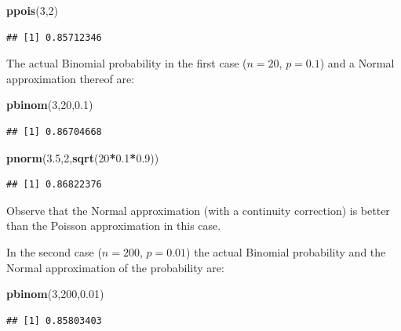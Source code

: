 \documentclass[]{krantz}
\makeatletter
\newenvironment{Shaded}{\begin{snugshade}}{\end{snugshade}}
\newcommand{\KeywordTok}[1]{\textcolor[rgb]{0.13,0.29,0.53}{\textbf{#1}}}
\newcommand{\DecValTok}[1]{\textcolor[rgb]{0.00,0.00,0.81}{#1}}
\newcommand{\FloatTok}[1]{\textcolor[rgb]{0.00,0.00,0.81}{#1}}
\newcommand{\OperatorTok}[1]{\textcolor[rgb]{0.81,0.36,0.00}{\textbf{#1}}}
\newcommand{\NormalTok}[1]{#1}
\newenvironment{kframe}{%
\medskip{}
\setlength{\fboxsep}{.8em}
 \def\at@end@of@kframe{}%
 \ifinner\ifhmode%
  \def\at@end@of@kframe{\end{minipage}}%
  \begin{minipage}{\columnwidth}%
 \fi\fi%
 \def\FrameCommand##1{\hskip\@totalleftmargin \hskip-\fboxsep
 \colorbox{shadecolor}{##1}\hskip-\fboxsep
     \hskip-\linewidth \hskip-\@totalleftmargin \hskip\columnwidth}%
 \MakeFramed {\advance\hsize-\width
   \@totalleftmargin\z@ \linewidth\hsize
   \@setminipage}}%
 {\par\unskip\endMakeFramed%
 \at@end@of@kframe}
\renewenvironment{Shaded}{\begin{kframe}}{\end{kframe}}
\theoremstyle{definition}
\theoremstyle{definition}
\theoremstyle{definition}
\theoremstyle{remark}
\makeatother
\begin{document}
\begin{Shaded}
\begin{Highlighting}[]
\KeywordTok{ppois}\NormalTok{(}\DecValTok{3}\NormalTok{,}\DecValTok{2}\NormalTok{)}
\end{Highlighting}
\end{Shaded}

\begin{verbatim}
## [1] 0.85712346
\end{verbatim}

The actual Binomial probability in the first case (\(n=20\), \(p=0.1\))
and a Normal approximation thereof are:

\begin{Shaded}
\begin{Highlighting}[]
\KeywordTok{pbinom}\NormalTok{(}\DecValTok{3}\NormalTok{,}\DecValTok{20}\NormalTok{,}\FloatTok{0.1}\NormalTok{)}
\end{Highlighting}
\end{Shaded}

\begin{verbatim}
## [1] 0.86704668
\end{verbatim}

\begin{Shaded}
\begin{Highlighting}[]
\KeywordTok{pnorm}\NormalTok{(}\FloatTok{3.5}\NormalTok{,}\DecValTok{2}\NormalTok{,}\KeywordTok{sqrt}\NormalTok{(}\DecValTok{20}\OperatorTok{*}\FloatTok{0.1}\OperatorTok{*}\FloatTok{0.9}\NormalTok{))}
\end{Highlighting}
\end{Shaded}

\begin{verbatim}
## [1] 0.86822376
\end{verbatim}

Observe that the Normal approximation (with a continuity correction) is
better than the Poisson approximation in this case.

In the second case (\(n=200\), \(p=0.01\)) the actual Binomial
probability and the Normal approximation of the probability are:

\begin{Shaded}
\begin{Highlighting}[]
\KeywordTok{pbinom}\NormalTok{(}\DecValTok{3}\NormalTok{,}\DecValTok{200}\NormalTok{,}\FloatTok{0.01}\NormalTok{)}
\end{Highlighting}
\end{Shaded}

\begin{verbatim}
## [1] 0.85803403
\end{verbatim}
\end{document}
